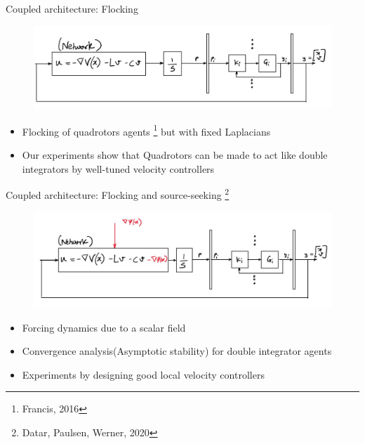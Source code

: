 \begin{frame}{Coupled architecture: Flocking}	
	\begin{figure}
		\includegraphics[scale=0.35]{figures/Coupled_flocking_quads.jpg}	
		\label{fig:Coupled}
	\end{figure}
	\begin{itemize}
		\item Flocking of quadrotors agents \footnote{Francis, 2016} but with fixed Laplacians
		\item Our experiments show that Quadrotors can be made to act like double integrators by well-tuned velocity controllers
	\end{itemize}
\end{frame}
\begin{frame}{Coupled architecture: Flocking and source-seeking \footnote{Datar, Paulsen, Werner, 2020}}
	\begin{figure}
		\includegraphics[scale=0.35]{figures/Coupled_flocking_quads_source_seek.jpg}	
		\label{fig:Coupled}
	\end{figure}	
	\begin{itemize}
		\item Forcing dynamics due to a scalar field
		\item Convergence analysis(Asymptotic stability) for double integrator agents
		\item Experiments by designing good local velocity controllers
	\end{itemize}
\end{frame}
